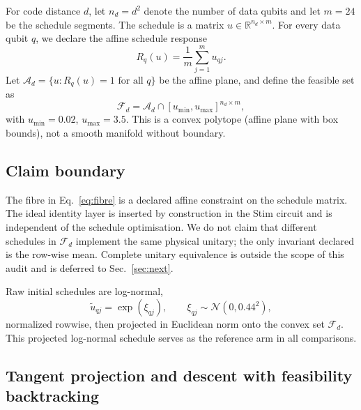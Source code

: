 \documentclass[11pt]{article}
\newcommand{\RR}{\mathbb{R}}
\newcommand{\F}{\mathcal{F}}
\begin{document}
For code distance \(d\), let \(n_d=d^2\) denote the number of data qubits and let \(m=24\) be the schedule segments. The schedule is a matrix \(u\in\RR^{n_d\times m}\). For every data qubit \(q\), we declare the affine schedule response
\begin{equation}
  R_q(u)=\frac{1}{m}\sum_{j=1}^{m}u_{qj}.
  \label{eq:response}
\end{equation}
Let \(\mathcal A_d = \{u : R_q(u)=1 \text{ for all } q\}\) be the affine plane, and define the feasible set as
\begin{equation}
  \F_d = \mathcal A_d \cap [u_{\min}, u_{\max}]^{n_d\times m},
  \label{eq:fibre}
\end{equation}
with \(u_{\min}=0.02\), \(u_{\max}=3.5\). This is a convex polytope (affine plane with box bounds), not a smooth manifold without boundary.

\subsection{Claim boundary}
\label{sec:boundary}

The fibre in Eq.~\eqref{eq:fibre} is a declared affine constraint on the schedule matrix. The ideal identity layer is inserted by construction in the Stim circuit and is independent of the schedule optimisation. We do not claim that different schedules in \(\F_d\) implement the same physical unitary; the only invariant declared is the row-wise mean. Complete unitary equivalence is outside the scope of this audit and is deferred to Sec.~\ref{sec:next}.

Raw initial schedules are log-normal,
\begin{equation*}
  \widetilde u_{qj}=\exp(\xi_{qj}),\qquad
  \xi_{qj}\sim\mathcal N(0,0.44^2),
\end{equation*}
normalized rowwise, then projected in Euclidean norm onto the convex set \(\F_d\). This projected log-normal schedule serves as the reference arm in all comparisons.

\subsection{Tangent projection and descent with feasibility backtracking}
\end{document}
